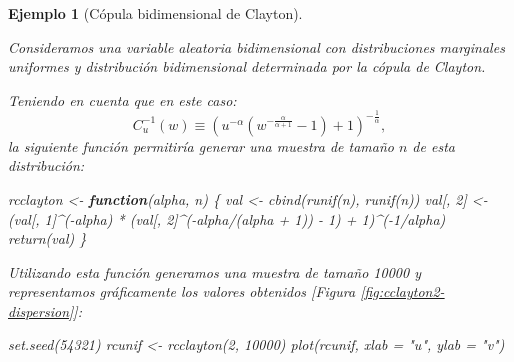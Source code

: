\documentclass[
  10pt,
]{book}
\newenvironment{Shaded}{\begin{snugshade}}{\end{snugshade}}
\newcommand{\AttributeTok}[1]{\textcolor[rgb]{0.77,0.63,0.00}{#1}}
\newcommand{\ControlFlowTok}[1]{\textcolor[rgb]{0.13,0.29,0.53}{\textbf{#1}}}
\newcommand{\DecValTok}[1]{\textcolor[rgb]{0.00,0.00,0.81}{#1}}
\newcommand{\FunctionTok}[1]{\textcolor[rgb]{0.00,0.00,0.00}{#1}}
\newcommand{\NormalTok}[1]{#1}
\newcommand{\OtherTok}[1]{\textcolor[rgb]{0.56,0.35,0.01}{#1}}
\newcommand{\SpecialCharTok}[1]{\textcolor[rgb]{0.00,0.00,0.00}{#1}}
\newcommand{\StringTok}[1]{\textcolor[rgb]{0.31,0.60,0.02}{#1}}
\theoremstyle{break}
\newtheorem{example}{Ejemplo}[chapter]
\theoremstyle{nonumberplain}
\begin{document}
\begin{example}[Cópula bidimensional de Clayton]
\protect\hypertarget{exm:clayton2d}{}\label{exm:clayton2d}

Consideramos una variable aleatoria bidimensional con distribuciones marginales uniformes y distribución bidimensional determinada por la cópula de Clayton.

Teniendo en cuenta que en este caso:
\[C_{u}^{-1}(w)\equiv\left(  u^{-\alpha}\left(  
w^{-\frac{\alpha}{\alpha+1}}-1\right) + 1 \right)^{-\frac{1}{\alpha}},\]
la siguiente función permitiría generar una muestra de tamaño \(n\) de esta distribución:

\begin{Shaded}
\begin{Highlighting}[]
\NormalTok{rcclayton }\OtherTok{\textless{}{-}} \ControlFlowTok{function}\NormalTok{(alpha, n) \{}
\NormalTok{  val }\OtherTok{\textless{}{-}} \FunctionTok{cbind}\NormalTok{(}\FunctionTok{runif}\NormalTok{(n), }\FunctionTok{runif}\NormalTok{(n))}
\NormalTok{  val[, }\DecValTok{2}\NormalTok{] }\OtherTok{\textless{}{-}}\NormalTok{ (val[, }\DecValTok{1}\NormalTok{]}\SpecialCharTok{\^{}}\NormalTok{(}\SpecialCharTok{{-}}\NormalTok{alpha) }\SpecialCharTok{*} 
\NormalTok{              (val[, }\DecValTok{2}\NormalTok{]}\SpecialCharTok{\^{}}\NormalTok{(}\SpecialCharTok{{-}}\NormalTok{alpha}\SpecialCharTok{/}\NormalTok{(alpha }\SpecialCharTok{+} \DecValTok{1}\NormalTok{)) }\SpecialCharTok{{-}} \DecValTok{1}\NormalTok{) }\SpecialCharTok{+} \DecValTok{1}\NormalTok{)}\SpecialCharTok{\^{}}\NormalTok{(}\SpecialCharTok{{-}}\DecValTok{1}\SpecialCharTok{/}\NormalTok{alpha)}
  \FunctionTok{return}\NormalTok{(val)}
\NormalTok{\}}
\end{Highlighting}
\end{Shaded}

Utilizando esta función generamos una muestra de tamaño 10000 y representamos gráficamente los valores obtenidos {[}Figura \ref{fig:cclayton2-dispersion}{]}:

\begin{Shaded}
\begin{Highlighting}[]
\FunctionTok{set.seed}\NormalTok{(}\DecValTok{54321}\NormalTok{)}
\NormalTok{rcunif }\OtherTok{\textless{}{-}} \FunctionTok{rcclayton}\NormalTok{(}\DecValTok{2}\NormalTok{, }\DecValTok{10000}\NormalTok{)}
\FunctionTok{plot}\NormalTok{(rcunif, }\AttributeTok{xlab =} \StringTok{"u"}\NormalTok{, }\AttributeTok{ylab =} \StringTok{"v"}\NormalTok{)}
\end{Highlighting}
\end{Shaded}


\end{example}
\end{document}
